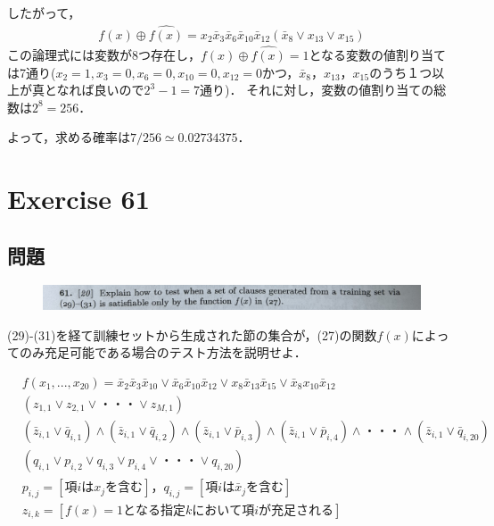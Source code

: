 \documentclass[dvipdfmx,a4paper,12pt]{jsarticle}
\begin{document}
 したがって，
 \begin{gather*}
f(x) \oplus \hat{f(x)} =  x_{2}\bar{x}_{3}\bar{x}_{6}\bar{x}_{10}\bar{x}_{12}(\bar{x}_{8} \lor x_{13} \lor x_{15})
\end{gather*}  
この論理式には変数が8つ存在し，$f(x) \oplus \hat{f(x)} = 1$となる変数の値割り当ては7通り($x_{2}=1,x_{3}=0,x_{6}=0,x_{10}=0,x_{12}=0$かつ，$\bar{x}_{8}，x_{13}，x_{15}$のうち１つ以上が真となれば良いので$2^3-1=7$通り)．
それに対し，変数の値割り当ての総数は$2^8=256$．

よって，求める確率は$7/256 \simeq 0.02734375$．


 
  
\newpage
\section*{Exercise 61}
\subsection*{問題}
 \begin{figure}[htbp]
  \centering
  \includegraphics[width=142mm,angle=0]{images/61.jpg}
  \end{figure}
(29)-(31)を経て訓練セットから生成された節の集合が，(27)の関数$f(x)$によってのみ充足可能である場合のテスト方法を説明せよ．
  
   \begin{align*}
&f(x_{1},...,x_{20}) = \bar{x}_{2}\bar{x}_{3}\bar{x}_{10}\lor\bar{x}_{6}\bar{x}_{10}\bar{x}_{12}\lor x_{8}\bar{x}_{13}\bar{x}_{15}\lor \bar{x}_{8}x_{10}\bar{x}_{12} \tag{27} \\
&(z_{1,1} \lor z_{2,1} \lor ・・・ \lor z_{M,1}) \tag{29} \\
&(\bar{z}_{i,1} \lor \bar{q}_{i,1}) \land (\bar{z}_{i,1} \lor \bar{q}_{i,2}) \land (\bar{z}_{i,1} \lor \bar{p}_{i,3}) \land (\bar{z}_{i,1} \lor \bar{p}_{i,4}) \land ・・・ \land (\bar{z}_{i,1} \lor \bar{q}_{i,20}) \tag{30} \\
&(q_{i,1} \lor p_{i,2} \lor q_{i,3} \lor p_{i,4} \lor ・・・ \lor q_{i,20}) \tag{31} \\
&p_{i,j} = [ 項iはx_{j}を含む]，q_{i,j} = [ 項iは\bar{x}_{j}を含む] \\
&z_{i,k} =[f(x)=1となる指定kにおいて項iが充足される]
\end{align*}  
\end{document}
